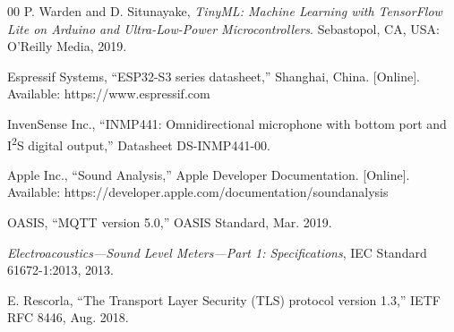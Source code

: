 \documentclass[conference]{IEEEtran}
\begin{document}
\begin{thebibliography}{00}
P. Warden and D. Situnayake, \textit{TinyML: Machine Learning with TensorFlow Lite on Arduino and Ultra-Low-Power Microcontrollers}. Sebastopol, CA, USA: O'Reilly Media, 2019.

Espressif Systems, ``ESP32-S3 series datasheet,'' Shanghai, China. [Online]. Available: https://www.espressif.com

InvenSense Inc., ``INMP441: Omnidirectional microphone with bottom port and I\textsuperscript{2}S digital output,'' Datasheet DS-INMP441-00.

Apple Inc., ``Sound Analysis,'' Apple Developer Documentation. [Online]. Available: https://developer.apple.com/documentation/soundanalysis

OASIS, ``MQTT version 5.0,'' OASIS Standard, Mar. 2019.

\textit{Electroacoustics---Sound Level Meters---Part 1: Specifications}, IEC Standard 61672-1:2013, 2013.

E. Rescorla, ``The Transport Layer Security (TLS) protocol version 1.3,'' IETF RFC 8446, Aug. 2018.

\end{thebibliography}
\end{document}
